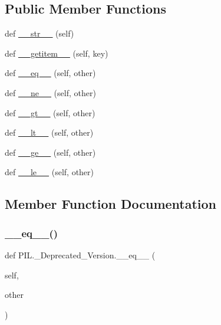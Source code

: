 \subsection*{Public Member Functions}
\begin{DoxyCompactItemize}
\item 
def \hyperlink{classPIL_1_1__Deprecated__Version_a8822e37ec3b086b1bb2f4450a18962ac}{\+\_\+\+\_\+str\+\_\+\+\_\+} (self)
\item 
def \hyperlink{classPIL_1_1__Deprecated__Version_abc76dd09dedf0ee73df7e2b129cb4735}{\+\_\+\+\_\+getitem\+\_\+\+\_\+} (self, key)
\item 
def \hyperlink{classPIL_1_1__Deprecated__Version_ad97462aa3a3986b53449769536799044}{\+\_\+\+\_\+eq\+\_\+\+\_\+} (self, other)
\item 
def \hyperlink{classPIL_1_1__Deprecated__Version_a2b009df7a4bb847ee806244fcbb525bb}{\+\_\+\+\_\+ne\+\_\+\+\_\+} (self, other)
\item 
def \hyperlink{classPIL_1_1__Deprecated__Version_a9de5c152a270b4f4eecfc2b3cf425117}{\+\_\+\+\_\+gt\+\_\+\+\_\+} (self, other)
\item 
def \hyperlink{classPIL_1_1__Deprecated__Version_aba26d8859b624e0271630a52add760a1}{\+\_\+\+\_\+lt\+\_\+\+\_\+} (self, other)
\item 
def \hyperlink{classPIL_1_1__Deprecated__Version_a217e6cf7daee818c049090315a47b7fa}{\+\_\+\+\_\+ge\+\_\+\+\_\+} (self, other)
\item 
def \hyperlink{classPIL_1_1__Deprecated__Version_ae20a9d36e3f3506df3c4b5ba05302fa7}{\+\_\+\+\_\+le\+\_\+\+\_\+} (self, other)
\end{DoxyCompactItemize}


\subsection{Member Function Documentation}
\mbox{\label{classPIL_1_1__Deprecated__Version_ad97462aa3a3986b53449769536799044}} 
\subsubsection{\texorpdfstring{\+\_\+\+\_\+eq\+\_\+\+\_\+()}{\_\_eq\_\_()}}
{\footnotesize\ttfamily def P\+I\+L.\+\_\+\+Deprecated\+\_\+\+Version.\+\_\+\+\_\+eq\+\_\+\+\_\+ (\begin{DoxyParamCaption}\item[{}]{self,  }\item[{}]{other }\end{DoxyParamCaption})}


